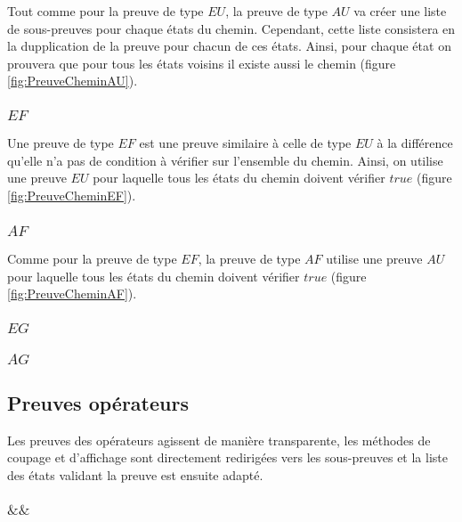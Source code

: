 \documentclass[dvipsnames]{report}
\begin{document}
Tout comme pour la preuve de type $EU$, la preuve de type $AU$ va créer une liste de sous-preuves pour chaque états du chemin. Cependant, cette liste consistera en la dupplication de la preuve pour chacun de ces états. Ainsi, pour chaque état on prouvera que pour tous les états voisins il existe aussi le chemin (figure \ref{fig:PreuveCheminAU}).



\subsubsection{$EF$}

Une preuve de type $EF$ est une preuve similaire à celle de type $EU$ à la différence qu'elle n'a pas de condition à vérifier sur l'ensemble du chemin. Ainsi, on utilise une preuve $EU$ pour laquelle tous les états du chemin doivent vérifier $true$ (figure \ref{fig:PreuveCheminEF}).



\subsubsection{$AF$}

Comme pour la preuve de type $EF$, la preuve de type $AF$ utilise une preuve $AU$ pour laquelle tous les états du chemin doivent vérifier $true$ (figure \ref{fig:PreuveCheminAF}).



\subsubsection{$EG$}

\subsubsection{$AG$}

\subsection{Preuves opérateurs}

Les preuves des opérateurs agissent de manière transparente, les méthodes de coupage et d'affichage sont directement redirigées vers les sous-preuves et la liste des états validant la preuve est ensuite adapté.

\subsubsection{$\&\&$}
\end{document}
